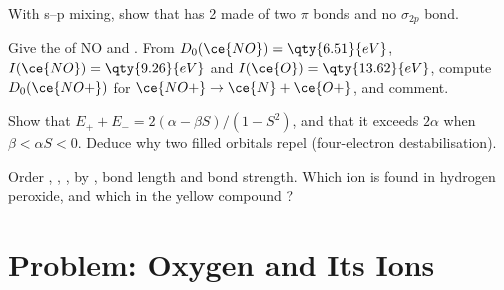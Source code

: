 \begin{exercise}[$\star\star$]\label{exo:b2:diatomic-mos:9}
With s--p mixing, show that  has  2 made of two $\pi$ bonds and no
$\sigma_{2p}$ bond.
\end{exercise}

\begin{exercise}[$\star\star\star$]\label{exo:b2:diatomic-mos:10}
Give the  of NO and . From $D_0(\ce{NO}) = \qty{6.51}{eV}$, $I(\ce{NO}) =
\qty{9.26}{eV}$ and $I(\ce{O}) = \qty{13.62}{eV}$, compute $D_0(\ce{NO+})$ for $\ce{NO+} \to
\ce{N} + \ce{O+}$, and comment.
\end{exercise}

\begin{exercise}[$\star\star\star$]\label{exo:b2:diatomic-mos:11}
Show that $E_+ + E_- = 2(\alpha - \beta S)/(1 - S^2)$, and that it exceeds $2\alpha$ when
$\beta < \alpha S < 0$. Deduce why two filled orbitals repel (four-electron
destabilisation).
\end{exercise}

\begin{exercise}[$\star\star\star$]\label{exo:b2:diatomic-mos:12}
Order , , ,  by , bond length and bond
strength. Which ion is found in hydrogen peroxide, and which in the yellow
compound ?
\end{exercise}

\section{Problem: Oxygen and Its Ions}

